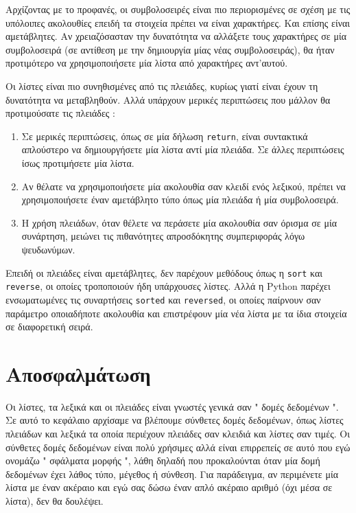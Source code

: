 \documentclass[10pt]{book}
\begin{document}
 Αρχίζοντας με το προφανές, οι συμβολοσειρές είναι πιο περιορισμένες σε σχέση με τις υπόλοιπες ακολουθίες επειδή τα στοιχεία πρέπει να είναι χαρακτήρες. Και επίσης είναι αμετάβλητες. Αν χρειαζόσασταν την δυνατότητα να αλλάξετε τους χαρακτήρες σε μία συμβολοσειρά (σε αντίθεση με την δημιουργία μίας νέας συμβολοσειράς), θα ήταν προτιμότερο να χρησιμοποιήσετε μία λίστα από χαρακτήρες αντ'αυτού.

Οι λίστες είναι πιο συνηθισμένες από τις πλειάδες, κυρίως γιατί είναι έχουν τη δυνατότητα να μεταβληθούν. Αλλά υπάρχουν μερικές περιπτώσεις που μάλλον θα προτιμούσατε τις πλειάδες :

\begin{enumerate}

\item  Σε μερικές περιπτώσεις, όπως σε μία δήλωση  {\tt return},  είναι συντακτικά απλούστερο να δημιουργήσετε μία λίστα αντί μία πλειάδα. Σε άλλες περιπτώσεις ίσως προτιμήσετε μία λίστα.

\item  Αν θέλατε να χρησιμοποιήσετε μία ακολουθία σαν κλειδί ενός λεξικού, πρέπει να χρησιμοποιήσετε έναν αμετάβλητο τύπο όπως μία πλειάδα ή μία συμβολοσειρά. 

\item  Η χρήση πλειάδων, όταν θέλετε να περάσετε μία ακολουθία σαν όρισμα σε μία συνάρτηση, μειώνει τις πιθανότητες απροσδόκητης συμπεριφοράς λόγω ψευδωνύμων.

\end{enumerate}

 Επειδή οι πλειάδες είναι αμετάβλητες, δεν παρέχουν μεθόδους όπως η  {\tt sort}  και  {\tt reverse},  οι οποίες τροποποιούν ήδη υπάρχουσες λίστες. Αλλά η  Python  παρέχει ενσωματωμένες τις συναρτήσεις  {\tt sorted}  και  {\tt reversed},  οι οποίες παίρνουν σαν παράμετρο οποιαδήποτε ακολουθία και επιστρέφουν μία νέα λίστα με τα ίδια στοιχεία σε διαφορετική σειρά.
 


\section{Αποσφαλμάτωση}

Οι λίστες, τα λεξικά και οι πλειάδες είναι γνωστές γενικά σαν  " δομές δεδομένων ".  Σε αυτό το κεφάλαιο αρχίσαμε να βλέπουμε σύνθετες δομές δεδομένων, όπως λίστες πλειάδων και λεξικά τα οποία περιέχουν πλειάδες σαν κλειδιά και λίστες σαν τιμές. Οι σύνθετες δομές δεδομένων είναι πολύ χρήσιμες αλλά είναι επιρρεπείς σε αυτό που εγώ ονομάζω  " σφάλματα μορφής ",  λάθη δηλαδή που προκαλούνται όταν μία δομή δεδομένων έχει λάθος τύπο, μέγεθος ή σύνθεση. Για παράδειγμα, αν περιμένετε μία λίστα με έναν ακέραιο και εγώ σας δώσω έναν απλό ακέραιο αριθμό (όχι μέσα σε λίστα), δεν θα δουλέψει.
\end{document}
